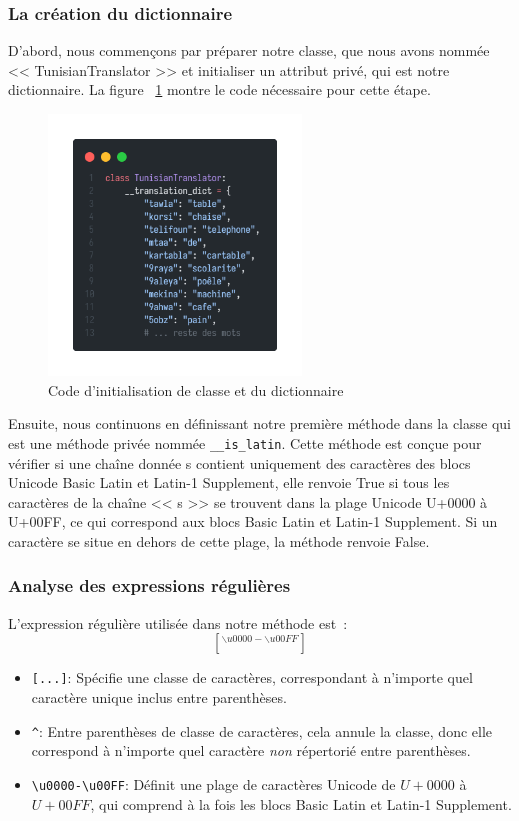 \subsubsection{La création du dictionnaire}
\noindent
D'abord, nous commençons par préparer notre classe, que nous avons nommée << TunisianTranslator >> et initialiser un attribut privé, qui est notre dictionnaire. La figure ~\ref{fig:dictionary} montre le code nécessaire pour cette étape.

\begin{figure}[H]
	\centering
	\includegraphics[width=0.6\textwidth]{logos/dictionary.png}
	\caption{Code d'initialisation de classe et du dictionnaire}
	\label{fig:dictionary}
\end{figure}

\noindent
Ensuite, nous continuons en définissant notre première méthode dans la classe qui est une méthode privée nommée \texttt{\_\_is\_latin}. Cette méthode est conçue pour vérifier si une chaîne donnée s contient uniquement des caractères des blocs Unicode Basic Latin et Latin-1 Supplement, elle renvoie True si tous les caractères de la chaîne << s >> se trouvent dans la plage Unicode U+0000 à U+00FF, ce qui correspond aux blocs Basic Latin et Latin-1 Supplement. Si un caractère se situe en dehors de cette plage, la méthode renvoie False.

\subsubsection{Analyse des expressions régulières}
\noindent
L'expression régulière utilisée dans notre méthode est :
\Large\[ [^{\backslash u0000-\backslash u00FF}] \]
\begin{itemize}
	\item \texttt{[...]}: Spécifie une classe de caractères, correspondant à n'importe quel caractère unique inclus entre parenthèses.
	\item \texttt{\^{}}: Entre parenthèses de classe de caractères, cela annule la classe, donc elle correspond à n'importe quel caractère \emph{non} répertorié entre parenthèses.
	\item \texttt{\textbackslash u0000-\textbackslash u00FF}: Définit une plage de caractères Unicode de \( U+0000 \) à \( U+00FF \), qui comprend à la fois les blocs Basic Latin et Latin-1 Supplement.
\end{itemize}

